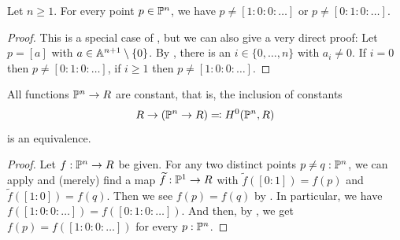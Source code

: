 \begin{lemma}%
  \label{point-in-projective-space-apart-from-two-standard-points}
  Let $n \geq 1$.
  For every point $p \in \mathbb{P}^n$,
  we have $p \neq [1 : 0 : 0 : \dots]$
  or $p \neq [0 : 1 : 0 : \dots]$.
\end{lemma}

\begin{proof}
  This is a special case of ,
  but we can also give a very direct proof:
  Let $p = [a]$ with $a \in \mathbb{A}^{n+1} \setminus \{0\}$.
  By ,
  there is an $i \in \{0, \dots, n\}$ with $a_i \neq 0$.
  If $i = 0$ then $p \neq [0 : 1 : 0 : \dots]$,
  if $i \geq 1$ then $p \neq [1 : 0 : 0 : \dots]$.
\end{proof}

\begin{theorem}%
  \label{functions-on-projective-space-constant}
  All functions $\mathbb{P}^n \to R$ are constant,
  that is, the inclusion of constants
  \[ R \to  (\mathbb{P}^n \to R) \eqqcolon H^0(\mathbb{P}^n, R) \]
  is an equivalence.
\end{theorem}

\begin{proof}
  Let $f : \mathbb{P}^n \to R$ be given.
  For any two distinct points $p \neq q : \mathbb{P}^n$,
  we can apply 
  and (merely) find a map $\widetilde{f} : \mathbb{P}^1 \to R$
  with $\widetilde{f}([0 : 1]) = f(p)$
  and $\widetilde{f}([1 : 0]) = f(q)$.
  Then we see $f(p) = f(q)$
  by .
  In particular, we have $f([1 : 0 : 0 : \dots]) = f([0 : 1 : 0 : \dots])$.
  And then, by ,
  we get $f(p) = f([1 : 0 : 0 : \dots])$ for every $p : \mathbb{P}^n$.
\end{proof}

